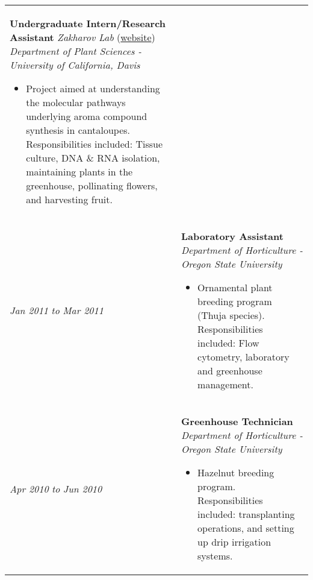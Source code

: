 ﻿\documentclass[a4paper]{article}
\begin{document}
\begin{tabular}{p{3cm} p{14cm}}
\textbf{Undergraduate Intern/Research Assistant}\newline
\textit{Zakharov Lab} (\href{http://www.plantsciences.ucdavis.edu/faculty/zakharov/}{website})\newline
\textit{Department of Plant Sciences - University of California, Davis}
\begin{itemize}[noitemsep,topsep=0pt]
  \item Project aimed at understanding the molecular pathways underlying aroma compound synthesis in cantaloupes. Responsibilities included: Tissue culture, DNA \& RNA isolation, maintaining plants in the greenhouse, pollinating flowers, and harvesting fruit.
\end{itemize}
%
\\
%
\vspace{0pt} 
\textit{Jan 2011}\newline
\textit{to}\newline
\textit{Mar 2011}\newline
&
\vspace{0pt}
\textbf{Laboratory Assistant}\newline
\textit{Department of Horticulture - Oregon State University}
\begin{itemize}[noitemsep,topsep=0pt]
  \item Ornamental plant breeding program (Thuja species). Responsibilities included: Flow cytometry, laboratory and greenhouse management.
\end{itemize}
%
%
%
\\
%
\vspace{0pt} 
\textit{Apr 2010}\newline
\textit{to}\newline
\textit{Jun 2010}\newline
&
\vspace{0pt}
\textbf{Greenhouse Technician}\newline
\textit{Department of Horticulture - Oregon State University}
\begin{itemize}[noitemsep,topsep=0pt]
  \item Hazelnut breeding program. Responsibilities included: transplanting operations, and setting up drip irrigation systems.
\end{itemize}
\end{tabular}
\end{document}
